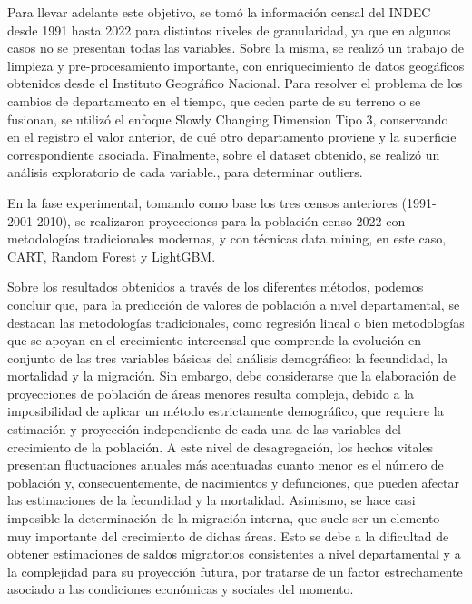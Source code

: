 \documentclass{article}
\theoremstyle{mytheoremstyle}
\theoremstyle{mytheoremstyle}
\theoremstyle{myproblemstyle}
\begin{document}
Para llevar adelante este objetivo, se tomó la información censal del INDEC desde 1991 hasta 2022 para distintos niveles de granularidad, ya que en algunos casos no se presentan todas las variables. Sobre la misma, se realizó un trabajo de 
limpieza y pre-procesamiento importante, con enriquecimiento de datos geogáficos obtenidos desde el Instituto Geográfico Nacional. Para resolver el problema de los cambios de departamento en el tiempo, que ceden parte de su terreno o se fusionan, 
se utilizó el enfoque Slowly Changing Dimension Tipo 3, conservando en el registro el valor anterior, de qué otro departamento proviene y la superficie correspondiente asociada. Finalmente, sobre el dataset obtenido, se realizó un análisis 
exploratorio de cada variable., para determinar outliers.\newline
 
En la fase experimental, tomando como base los tres censos anteriores (1991-2001-2010), se realizaron proyecciones para la población censo 2022 con metodologías tradicionales modernas, y con técnicas data mining, en este caso, CART, 
Random Forest  y LightGBM. \newline

Sobre los resultados obtenidos a través de los diferentes métodos, podemos concluir que, para la predicción de valores de población a nivel departamental, se destacan las metodologías tradicionales, como regresión lineal o bien metodologías que se apoyan en el crecimiento intercensal que comprende la evolución en conjunto de las tres variables básicas del análisis demográfico: la fecundidad, la mortalidad y la migración. Sin embargo, debe  considerarse que la elaboración de proyecciones de población de áreas menores resulta compleja, debido a la imposibilidad de aplicar un método estrictamente demográfico, que requiere la estimación y proyección independiente de cada una de las variables del crecimiento 
de la población. A este nivel de desagregación, los hechos vitales presentan fluctuaciones anuales más acentuadas cuanto menor es el número de población y, consecuentemente, de nacimientos y defunciones, que pueden afectar las estimaciones de la fecundidad y la mortalidad. Asimismo, se hace casi imposible la determinación de la migración interna, que suele ser un elemento muy importante del crecimiento de dichas áreas. Esto se debe a la dificultad de obtener estimaciones 
 de saldos migratorios consistentes a nivel departamental y a la complejidad para su proyección futura, por tratarse de un factor estrechamente asociado a las condiciones económicas y sociales del momento.\newline
\end{document}
